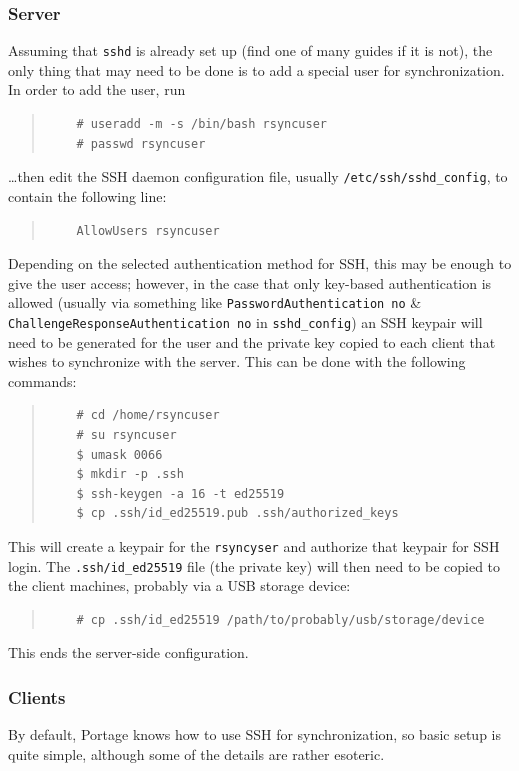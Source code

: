\documentclass{article}
\begin{document}
\subsubsection{Server} Assuming that \texttt{sshd} is already set up (find one of many guides if it is not), the only thing that may need to be done is to add a special user for synchronization.  In order to add the user, run
\begin{quote}
\begin{verbatim}
	# useradd -m -s /bin/bash rsyncuser
	# passwd rsyncuser
\end{verbatim}
\end{quote}
\ldots then edit the SSH daemon configuration file, usually \texttt{/etc/ssh/sshd_config}, to contain the following line:
\begin{quote}
\begin{verbatim}
	AllowUsers rsyncuser
\end{verbatim}
\end{quote}
Depending on the selected authentication method for SSH, this may be enough to give the user access; however, in the case that only key-based authentication is allowed (usually via something like \texttt{PasswordAuthentication no} \& \texttt{ChallengeResponseAuthentication no} in \texttt{sshd_config}) an SSH keypair will need to be generated for the user and the private key copied to each client that wishes to synchronize with the server.  This can be done with the following commands:
\begin{quote}
\begin{verbatim}
	# cd /home/rsyncuser
	# su rsyncuser
	$ umask 0066
	$ mkdir -p .ssh
	$ ssh-keygen -a 16 -t ed25519
	$ cp .ssh/id_ed25519.pub .ssh/authorized_keys
\end{verbatim}
\end{quote}
This will create a keypair for the \texttt{rsyncyser} and authorize that keypair for SSH login.  The \texttt{.ssh/id_ed25519} file (the private key) will then need to be copied to the client machines, probably via a USB storage device:
\begin{quote}
\begin{verbatim}
	# cp .ssh/id_ed25519 /path/to/probably/usb/storage/device
\end{verbatim}
\end{quote}

This ends the server-side configuration.

\subsubsection{Clients}
By default, Portage knows how to use SSH for synchronization, so basic setup is quite simple, although some of the details are rather esoteric.
\end{document}
